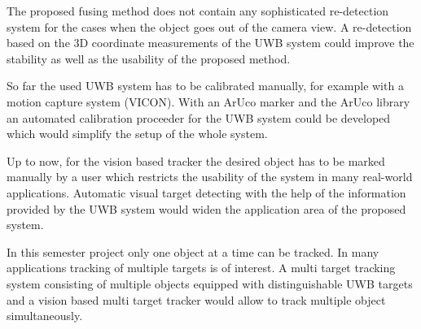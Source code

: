 The proposed fusing method does not contain any sophisticated re-detection system for the cases when the object goes out of the camera view. A re-detection based on the 3D coordinate measurements of the \ac{UWB} system could improve the stability as well as the usability of the proposed method.

So far the used \ac{UWB} system has to be calibrated manually, for example with a motion capture system (VICON). With an ArUco marker and the ArUco library \cite{Aruco2014} an automated calibration proceeder for the \ac{UWB} system could be developed which would simplify the setup of the whole system. 

Up to now, for the vision based tracker the desired object has to be marked manually by a user which restricts the usability of the system in many real-world applications. Automatic visual target detecting with the help of the information provided by the \ac{UWB} system would widen the application area of the proposed system.

In this semester project only one object at a time can be tracked. In many applications tracking of multiple targets is of interest. A multi target tracking system consisting of multiple objects equipped with distinguishable \ac{UWB} targets and a vision based multi target tracker would allow to track multiple object simultaneously. 